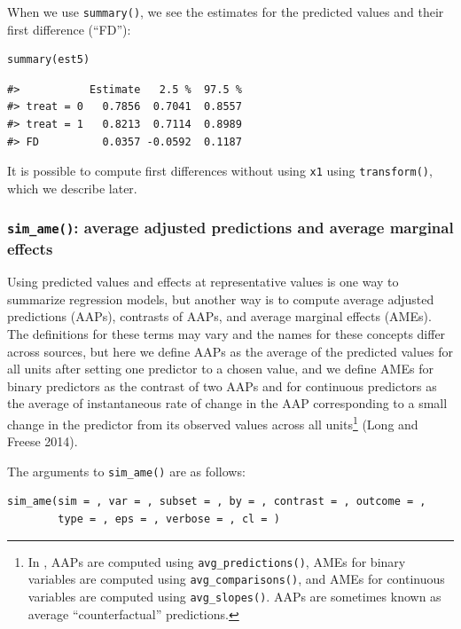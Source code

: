 When we use \texttt{summary()}, we see the estimates for the predicted values and their first difference (``FD''):

\begin{verbatim}
summary(est5)
\end{verbatim}

\begin{verbatim}
#>           Estimate   2.5 %  97.5 %
#> treat = 0   0.7856  0.7041  0.8557
#> treat = 1   0.8213  0.7114  0.8989
#> FD          0.0357 -0.0592  0.1187
\end{verbatim}

It is possible to compute first differences without using \texttt{x1} using \texttt{transform()}, which we describe later.

\hypertarget{sim_ame-average-adjusted-predictions-and-average-marginal-effects}{%
\subsubsection{\texorpdfstring{\texttt{sim\_ame()}: average adjusted predictions and average marginal effects}{sim\_ame(): average adjusted predictions and average marginal effects}}\label{sim_ame-average-adjusted-predictions-and-average-marginal-effects}}

Using predicted values and effects at representative values is one way to summarize regression models, but another way is to compute average adjusted predictions (AAPs), contrasts of AAPs, and average marginal effects (AMEs). The definitions for these terms may vary and the names for these concepts differ across sources, but here we define AAPs as the average of the predicted values for all units after setting one predictor to a chosen value, and we define AMEs for binary predictors as the contrast of two AAPs and for continuous predictors as the average of instantaneous rate of change in the AAP corresponding to a small change in the predictor from its observed values across all units\footnote{In , AAPs are computed using \texttt{avg\_predictions()}, AMEs for binary variables are computed using \texttt{avg\_comparisons()}, and AMEs for continuous variables are computed using \texttt{avg\_slopes()}. AAPs are sometimes known as average ``counterfactual'' predictions.} (Long and Freese 2014).

The arguments to \texttt{sim\_ame()} are as follows:

\begin{verbatim}
sim_ame(sim = , var = , subset = , by = , contrast = , outcome = ,
        type = , eps = , verbose = , cl = )
\end{verbatim}

